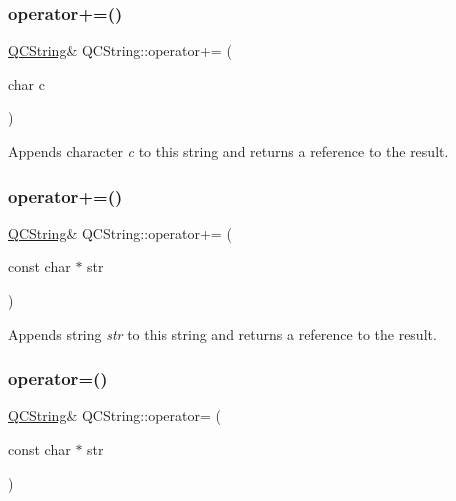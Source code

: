 \subsubsection{\texorpdfstring{operator+=()}{operator+=()}\hspace{0.1cm}{\footnotesize\ttfamily [1/2]}}
{\footnotesize\ttfamily \mbox{\hyperlink{class_q_c_string}{Q\+C\+String}}\& Q\+C\+String\+::operator+= (\begin{DoxyParamCaption}\item[{char}]{c }\end{DoxyParamCaption})\hspace{0.3cm}{\ttfamily [inline]}}

Appends character {\itshape c} to this string and returns a reference to the result. \mbox{\label{class_q_c_string_a2ebe64838cf88c7206b76c3c431d0adc}} 
\subsubsection{\texorpdfstring{operator+=()}{operator+=()}\hspace{0.1cm}{\footnotesize\ttfamily [2/2]}}
{\footnotesize\ttfamily \mbox{\hyperlink{class_q_c_string}{Q\+C\+String}}\& Q\+C\+String\+::operator+= (\begin{DoxyParamCaption}\item[{const char $\ast$}]{str }\end{DoxyParamCaption})\hspace{0.3cm}{\ttfamily [inline]}}

Appends string {\itshape str} to this string and returns a reference to the result. \mbox{\label{class_q_c_string_aff5d046c512aee21b575abb2b7528282}} 
\subsubsection{\texorpdfstring{operator=()}{operator=()}\hspace{0.1cm}{\footnotesize\ttfamily [1/2]}}
{\footnotesize\ttfamily \mbox{\hyperlink{class_q_c_string}{Q\+C\+String}}\& Q\+C\+String\+::operator= (\begin{DoxyParamCaption}\item[{const char $\ast$}]{str }\end{DoxyParamCaption})\hspace{0.3cm}{\ttfamily [inline]}}

